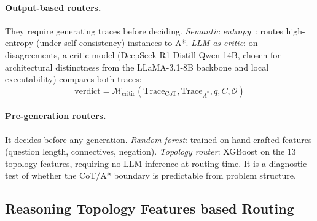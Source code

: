 \documentclass[10pt]{article}
\begin{document}
\paragraph{Output-based routers.} They require generating traces before deciding. \emph{Semantic entropy}~\citep{kossen2024semanticentropyprobesrobust}: routes high-entropy (under self-consistency) instances to A*. \emph{LLM-as-critic}: on disagreements, a critic model (DeepSeek-R1-Distill-Qwen-14B, chosen for architectural distinctness from the LLaMA-3.1-8B backbone and local executability) compares both traces:
\begin{equation}
\text{verdict} = \mathcal{M}_{\text{critic}}(\text{Trace}_{\text{CoT}}, \text{Trace}_{A^*}, q, C, \mathcal{O})
\label{eq:critic}
\end{equation}

\paragraph{Pre-generation routers.} It decides before any generation. \emph{Random forest}: trained on hand-crafted features (question length, connectives, negation). \emph{Topology router}: XGBoost on the 13 topology features, requiring no LLM inference at routing time. It is a diagnostic test of whether the CoT/A* boundary is predictable from problem structure.


\subsection{Reasoning Topology Features based Routing}
\label{sec:topology_features}

\end{document}
